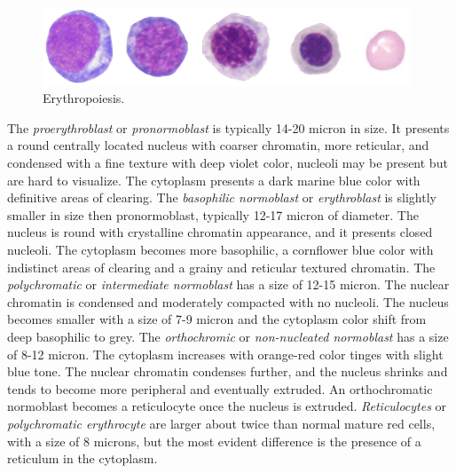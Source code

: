 \begin{figure}[!htbp]
	\centering
	\includegraphics[width=0.98\textwidth]{images/erythropoiesis}
	\caption{\label{fig:Erythropoiesis} Erythropoiesis.}
\end{figure}

The \textit{proerythroblast} or \textit{pronormoblast} is typically 14-20 micron in size. It presents a round centrally located nucleus with coarser chromatin, more reticular, and condensed with a fine texture with deep violet color, nucleoli may be present but are hard to visualize. The cytoplasm presents a dark marine blue color with definitive areas of clearing. The \textit{basophilic normoblast} or \textit{erythroblast} is slightly smaller in size then pronormoblast, typically 12-17 micron of diameter. The nucleus is round with crystalline chromatin appearance, and it presents closed nucleoli. The cytoplasm becomes more basophilic, a cornflower blue color with indistinct areas of clearing and a grainy and reticular textured chromatin. The \textit{polychromatic} or \textit{intermediate normoblast} has a size of 12-15 micron. The nuclear chromatin is condensed and moderately compacted with no nucleoli.
The nucleus becomes smaller with a size of 7-9 micron and the cytoplasm color shift from deep basophilic to grey. The \textit{orthochromic} or \textit{non-nucleated normoblast} has a size of 8-12 micron. The cytoplasm increases with orange-red color tinges with slight blue tone. The nuclear chromatin condenses further, and the nucleus shrinks and tends to become more peripheral and eventually extruded. An orthochromatic normoblast becomes a reticulocyte once the nucleus is extruded. \textit{Reticulocytes} or \textit{polychromatic erythrocyte} are larger about twice than normal mature red cells, with a size of 8 microns, but the most evident difference is the presence of a reticulum in the cytoplasm.
